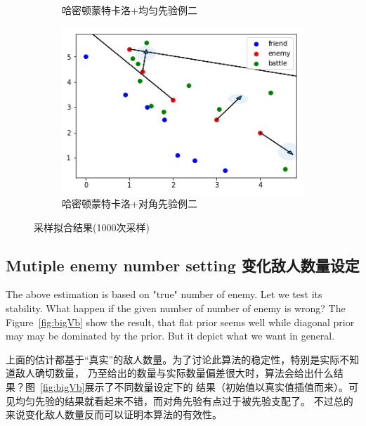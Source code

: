 \documentclass{article}
\begin{document}
\begin{figure}[ht]
\begin{subfigure}[b]{0.45\linewidth}
    \caption{哈密顿蒙特卡洛+均匀先验例二}
  \end{subfigure}
  \begin{subfigure}[b]{0.45\linewidth}
    \includegraphics[width=\linewidth]{Sampling42.png}
    \caption{哈密顿蒙特卡洛+对角先验例二}
  \end{subfigure}
  \caption{采样拟合结果(1000次采样)}
  \label{fig:SamplingTen}
\end{figure}

\subsection{Mutiple enemy number setting 变化敌人数量设定}

The above estimation is based on "true" number of enemy. Let we test its stability. 
What happen if the given number of number of enemy is wrong? The Figure~\ref{fig:bigVb} 
show the result, that flat prior seems well while diagonal prior may may be dominated by 
the prior. But it depict what we want in general.

上面的估计都基于“真实”的敌人数量。为了讨论此算法的稳定性，特别是实际不知道敌人确切数量，
乃至给出的数量与实际数量偏差很大时，算法会给出什么结果？图~\ref{fig:bigVb}展示了不同数量设定下的
结果（初始值以真实值插值而来）。可见均匀先验的结果就看起来不错，而对角先验有点过于被先验支配了。
不过总的来说变化敌人数量反而可以证明本算法的有效性。
\end{document}

